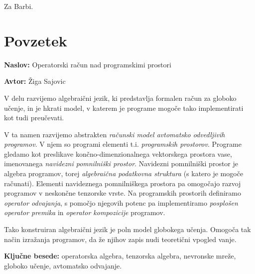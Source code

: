 \documentclass[a4paper, 12pt]{book}
\newcommand{\ttitle}{Operatorski račun nad programskimi prostori}
\newcommand{\tauthor}{Žiga Sajovic}
\newcommand{\tkeywords}{operatorska algebra, tenzorska algebra, nevronske mreže, globoko učenje, avtomatsko odvajanje}
\newcommand{\clearemptydoublepage}{\newpage{\pagestyle{empty}\cleardoublepage}}
\begin{document}
\clearemptydoublepage

\thispagestyle{empty}\mbox{}{\textheight}\mbox{}\hfill\begin{minipage}{0.55\textwidth}%
Za Barbi.
\normalfont\end{minipage}

\clearemptydoublepage


\pagestyle{empty}
\def\thepage{}%
\tableofcontents{}


\clearemptydoublepage

\chapter*{Povzetek}

\noindent\textbf{Naslov:} \ttitle
\bigskip

\noindent\textbf{Avtor:} \tauthor
\bigskip

\noindent
V delu razvijemo algebraični jezik, ki predstavlja formalen račun za globoko učenje, in je hkrati model, v katerem je programe mogoče tako implementirati kot tudi preučevati.

V ta namen razvijemo abstrakten \emph{računski model avtomatsko odvedljivih programov}. V njem so programi elementi t.i. \emph{programskih prostorov}. Programe gledamo kot preslikave končno-dimenzionalnega vektorskega prostora vase, imenovanega \emph{navidezni pomnilniški prostor}. Navidezni pomnilniški prostor je algebra programov, torej \emph{algebraična podatkovna struktura} (s katero je mogoče računati). Elementi navideznega pomnilniškega prostora pa omogočajo razvoj programov v neskončne tenzorske vrste. Na programskih prostorih definiramo \emph{operator odvajanja}, s pomočjo njegovih potenc pa implementiramo \emph{posplošen operator premika} in \emph{operator kompozicije} programov.

Tako konstruiran algebraični jezik je poln model globokega učenja. Omogoča tak način izražanja programov, da že njihov zapis nudi teoretični vpogled vanje.

\bigskip

\noindent\textbf{Ključne besede:} \tkeywords.
\clearemptydoublepage
\end{document}
